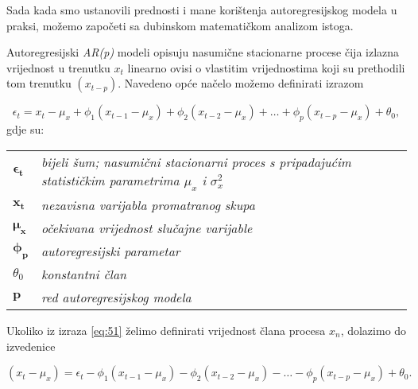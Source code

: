 \documentclass[a4paper,12pt,oneside]{memoir}
\begin{document}
            Sada kada smo ustanovili prednosti i mane korištenja autoregresijskog modela u praksi, možemo započeti sa dubinskom matematičkom analizom istoga.

            Autoregresijski \textit{AR(p)} modeli opisuju nasumične stacionarne procese čija izlazna vrijednost u trenutku $x_t$ linearno ovisi o vlastitim vrijednostima koji su prethodili tom trenutku $(x_{t-p})$. Navedeno opće načelo možemo definirati izrazom

            \begin{equation}
                \epsilon_t=x_t-\mu_x+\phi_1(x_{t-1}-\mu_x)+\phi_2(x_{t-2}-\mu_x)+\ldots+\phi_p(x_{t-p}-\mu_x)+\theta_0,
                \label{eq:51}
            \end{equation}
            gdje su:

            \begin{table}[H]
                \centering
                \begin{tabular*}{0.9\textwidth}{>{\bfseries}l p{13cm}}
                    \textit{\textbf{$\boldsymbol{\epsilon_t}$}} & \textit{bijeli šum; nasumični stacionarni proces s pripadajućim statističkim parametrima $\mu_x$ i $\sigma_x^2$}\\
                    \textit{\textbf{$\boldsymbol{x_t}$}} & \textit{nezavisna varijabla promatranog skupa}\\
                    \textit{\textbf{$\boldsymbol{\mu_x}$}} & \textit{očekivana vrijednost slučajne varijable}\\
                    \textit{\textbf{$\boldsymbol{\phi_p}$}} & \textit{autoregresijski parametar}\\
                    \textit{\textbf{$\theta_0$}} & \textit{konstantni član}\\
                    \textit{\textbf{$\boldsymbol{p}$}} & \textit{red autoregresijskog modela}\\
                \end{tabular*}
            \end{table}

            Ukoliko iz izraza \ref{eq:51} želimo definirati vrijednost člana procesa $x_n$, dolazimo do izvedenice

            \begin{equation}
                (x_t-\mu_x)=\epsilon_t-\phi_1(x_{t-1}-\mu_x)-\phi_2(x_{t-2}-\mu_x)-\ldots-\phi_p(x_{t-p}-\mu_x)+\theta_0.
                \label{eq:52}
            \end{equation}
\end{document}
